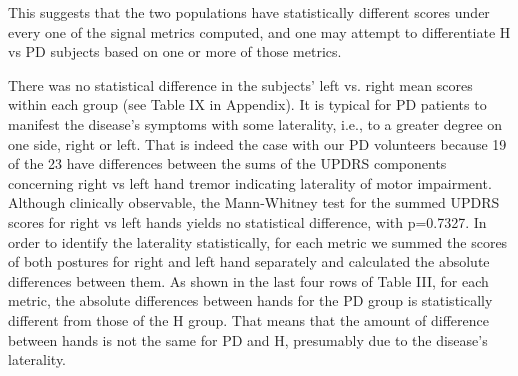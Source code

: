This suggests that the two populations have statistically different scores under every one of the signal metrics computed, and one may attempt to differentiate H vs PD subjects based on one or more of those metrics.

 There was no statistical difference in the subjects’ left vs. right mean scores within each group (see Table IX in Appendix). It is typical for PD patients to manifest the disease’s symptoms with some laterality, i.e., to a greater degree on one side, right or left. That is indeed the case with our PD volunteers because 19 of the 23 have differences between the sums of the UPDRS components concerning right vs left hand tremor indicating laterality of motor impairment. Although clinically observable, the Mann-Whitney test for the summed UPDRS scores for right vs left hands yields no statistical difference, with p=0.7327. In order to identify the laterality statistically, for each metric we summed the scores of both postures for right and left hand separately and calculated the absolute differences between them. As shown in the last four rows of Table III, for each metric, the absolute differences between hands for the PD group is statistically different from those of the H group. That means that the amount of difference between hands is not the same for PD and H, presumably due to the disease’s laterality.









